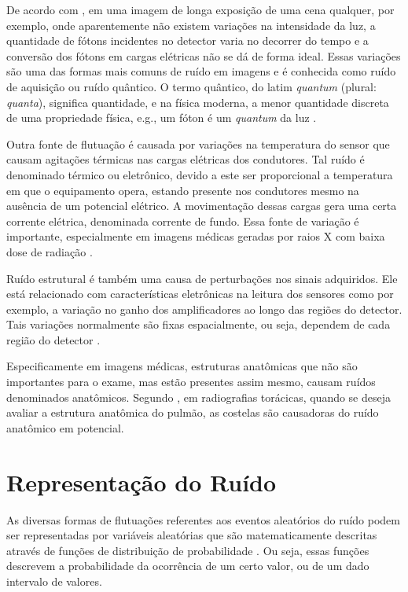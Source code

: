 De acordo com , em uma imagem de longa exposição de uma cena qualquer, por exemplo, onde aparentemente não existem variações na intensidade da luz, a quantidade de fótons incidentes no detector varia no decorrer do tempo e a conversão dos fótons em cargas elétricas não se dá de forma ideal. Essas variações são uma das formas mais comuns de ruído em imagens e é conhecida como ruído de aquisição ou ruído quântico. O termo quântico, do latim \textit{quantum} (plural: \textit{quanta}), significa quantidade, e na física moderna, a menor quantidade discreta de uma propriedade física, e.g., um fóton é um \textit{quantum} da luz \cite{bushberg2011essential}. 

Outra fonte de flutuação é causada por variações na temperatura do sensor que causam agitações térmicas nas cargas elétricas dos condutores. Tal ruído é denominado térmico ou eletrônico, devido a este ser proporcional a temperatura em que o equipamento opera, estando presente nos condutores mesmo na ausência de um potencial elétrico. A movimentação dessas cargas gera uma certa corrente elétrica, denominada corrente de fundo. Essa fonte de variação é importante, especialmente em imagens médicas geradas por raios X com baixa dose de radiação \cite{bertalmiodenoising2018}.

Ruído estrutural é também uma causa de perturbações nos sinais adquiridos. Ele está relacionado com características eletrônicas na leitura dos sensores como por exemplo, a variação no ganho dos amplificadores ao longo das regiões do detector. Tais variações normalmente são fixas espacialmente, ou seja, dependem de cada região do detector \cite{bushberg2011essential,marshall2017handbook}.

Especificamente em imagens médicas, estruturas anatômicas que não são importantes para o exame, mas estão presentes assim mesmo, causam ruídos denominados anatômicos. Segundo , em radiografias torácicas, quando se deseja avaliar a estrutura anatômica do pulmão, as costelas são causadoras do ruído anatômico em potencial.

 
\section{Representação do Ruído}

As diversas formas de flutuações referentes aos eventos aleatórios do ruído podem ser representadas por variáveis aleatórias que são matematicamente descritas através de funções de distribuição de probabilidade \cite{prince2006medical}. Ou seja, essas funções descrevem a probabilidade da ocorrência de um certo valor, ou de um dado intervalo de valores. 

